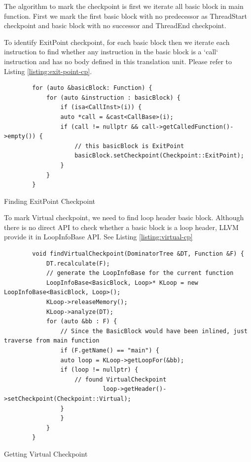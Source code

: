 The algorithm to mark the checkpoint is first we iterate all basic block in main function. First we mark the first basic block with no predecessor as ThreadStart checkpoint and basic block with no successor and ThreadEnd checkpoint. 

To identify ExitPoint checkpoint, for each basic block then we iterate  each instruction to find whether any instruction in the basic block is a `call` instruction and has no body defined in this translation unit. Please refer to Listing \ref{listing:exit-point-cp}.

\begin{listing}[htbp]
    \begin{verbatim}
        for (auto &basicBlock: Function) {
            for (auto &instruction : basicBlock) {
                if (isa<CallInst>(i)) {
                auto *call = &cast<CallBase>(i);
                if (call != nullptr && call->getCalledFunction()->empty()) {
                    // this basicBlock is ExitPoint
                    basicBlock.setCheckpoint(Checkpoint::ExitPoint);
                } 
            }
        } 
    \end{verbatim}
    \caption{Finding ExitPoint Checkpoint}    
    \label{listing:exit-point-cp}
\end{listing}

To mark Virtual checkpoint, we need to find loop header basic block. Although there is no direct API to check whether a basic block is a loop header, LLVM provide it in LoopInfoBase API. See Listing \ref{listing:virtual-cp}

\begin{listing}[htbp]
    \begin{verbatim}
        void findVirtualCheckpoint(DominatorTree &DT, Function &F) {
            DT.recalculate(F);
            // generate the LoopInfoBase for the current function
            LoopInfoBase<BasicBlock, Loop>* KLoop = new LoopInfoBase<BasicBlock, Loop>();
            KLoop->releaseMemory();
            KLoop->analyze(DT);
            for (auto &bb : F) {
                // Since the BasicBlock would have been inlined, just traverse from main function
                if (F.getName() == "main") {
                auto loop = KLoop->getLoopFor(&bb);
                if (loop != nullptr) {
                    // found VirtualCheckpoint
                            loop->getHeader()->setCheckpoint(Checkpoint::Virtual);
                }
                }
            }
        }
    \end{verbatim}
    \caption{Getting Virtual Checkpoint}
    \label{listing:virtual-cp}
\end{listing}

